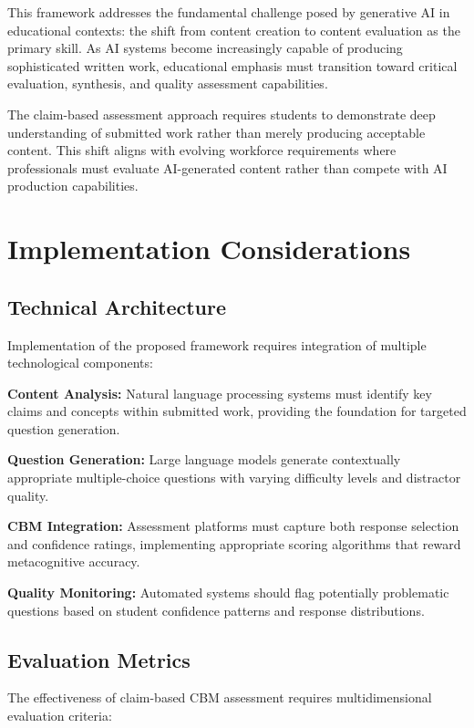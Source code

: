 \documentclass[sigconf]{acmart}
\begin{document}
This framework addresses the fundamental challenge posed by generative AI in educational contexts: the shift from content creation to content evaluation as the primary skill. As AI systems become increasingly capable of producing sophisticated written work, educational emphasis must transition toward critical evaluation, synthesis, and quality assessment capabilities.

The claim-based assessment approach requires students to demonstrate deep understanding of submitted work rather than merely producing acceptable content. This shift aligns with evolving workforce requirements where professionals must evaluate AI-generated content rather than compete with AI production capabilities.

\section{Implementation Considerations}

\subsection{Technical Architecture}

Implementation of the proposed framework requires integration of multiple technological components:

\textbf{Content Analysis:} Natural language processing systems must identify key claims and concepts within submitted work, providing the foundation for targeted question generation.

\textbf{Question Generation:} Large language models generate contextually appropriate multiple-choice questions with varying difficulty levels and distractor quality.

\textbf{CBM Integration:} Assessment platforms must capture both response selection and confidence ratings, implementing appropriate scoring algorithms that reward metacognitive accuracy.

\textbf{Quality Monitoring:} Automated systems should flag potentially problematic questions based on student confidence patterns and response distributions.

\subsection{Evaluation Metrics}

The effectiveness of claim-based CBM assessment requires multidimensional evaluation criteria:
\end{document}
